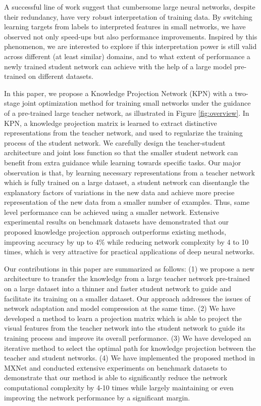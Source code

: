 \documentclass[journal]{IEEEtran}
\begin{document}
A successful line of work \cite{bucilua2006model,hinton2015distilling,romero2014fitnets, hou2016skeleton, xiong2016convolutional} suggest that cumbersome large neural networks, despite their redundancy, have very robust interpretation of training data. By switching learning targets from labels to interpreted features in small networks, we have observed not only speed-ups but also performance improvements. Inspired by this phenomenon, we are interested to explore if this interpretation power is still valid across different (at least similar) domains, and to what extent of performance a newly trained student network can achieve with the help of a large model pre-trained on different datasets. 

In this paper, we propose a Knowledge Projection Network (KPN) with a two-stage joint optimization method for training small networks under the guidance of a pre-trained large teacher network, as illustrated in Figure \ref{fig:overview}. In KPN, a knowledge projection matrix is learned to extract distinctive representations from the teacher network, and used to regularize the training process of the student network. We carefully design the teacher-student architecture and joint loss function so that the smaller student network can benefit from extra guidance while learning towards specific tasks. Our major observation is that, by learning  necessary representations from a teacher network which is fully trained on a large dataset, a student network can disentangle the explanatory factors of variations in the new data and achieve more precise representation of the new data from a smaller number of examples. Thus, same level performance can be achieved using a smaller network. 
Extensive experimental results on benchmark datasets have demonstrated that our proposed knowledge projection approach outperforms existing methods, improving accuracy by up to 4\% while reducing network complexity by 4 to 10 times, which is very attractive for practical applications of deep neural networks.



Our contributions in this paper are summarized as follows:
(1) we propose a new architecture to transfer the knowledge from a large  teacher network pre-trained on a large dataset into a thinner and faster student network to guide and facilitate its training on a smaller dataset. Our approach addresses the issues of network adaptation and model compression at the same time. 
(2) We have developed a method to learn a projection matrix which is able to project the visual features from the teacher network into the student network to guide its training process and improve its overall performance.  
(3) We have developed an iterative method to select the optimal path for knowledge projection between the teacher and student networks. 
(4) We have implemented the proposed method in MXNet  and conducted extensive experiments on benchmark datasets to demonstrate that our method is able to significantly reduce the network computational complexity by 4-10 times while largely maintaining or even improving the network performance by a significant margin. 
\end{document}
